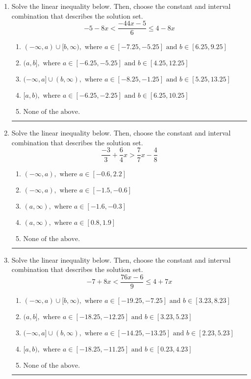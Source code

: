 \documentclass[14pt]{extbook}
\newcommand{\litem}[1]{\item#1\hspace*{-1cm}\rule{\textwidth}{0.4pt}}
\begin{document}
\begin{enumerate}
{\begin{enumerate}[label=\Alph*.]
\end{enumerate} }
\litem{
Solve the linear inequality below. Then, choose the constant and interval combination that describes the solution set.\[ -5 - 8 x < \frac{-44 x - 5}{6} \leq 4 - 8 x \]\begin{enumerate}[label=\Alph*.]
\item \( (-\infty, a) \cup [b, \infty), \text{ where } a \in [-7.25, -5.25] \text{ and } b \in [6.25, 9.25] \)
\item \( (a, b], \text{ where } a \in [-6.25, -5.25] \text{ and } b \in [4.25, 12.25] \)
\item \( (-\infty, a] \cup (b, \infty), \text{ where } a \in [-8.25, -1.25] \text{ and } b \in [5.25, 13.25] \)
\item \( [a, b), \text{ where } a \in [-6.25, -2.25] \text{ and } b \in [6.25, 10.25] \)
\item \( \text{None of the above.} \)

\end{enumerate} }
\litem{
Solve the linear inequality below. Then, choose the constant and interval combination that describes the solution set.\[ \frac{-3}{3} + \frac{6}{4} x > \frac{7}{7} x - \frac{4}{8} \]\begin{enumerate}[label=\Alph*.]
\item \( (-\infty, a), \text{ where } a \in [-0.6, 2.2] \)
\item \( (-\infty, a), \text{ where } a \in [-1.5, -0.6] \)
\item \( (a, \infty), \text{ where } a \in [-1.6, -0.3] \)
\item \( (a, \infty), \text{ where } a \in [0.8, 1.9] \)
\item \( \text{None of the above}. \)

\end{enumerate} }
\litem{
Solve the linear inequality below. Then, choose the constant and interval combination that describes the solution set.\[ -7 + 8 x < \frac{76 x - 6}{9} \leq 4 + 7 x \]\begin{enumerate}[label=\Alph*.]
\item \( (-\infty, a) \cup [b, \infty), \text{ where } a \in [-19.25, -7.25] \text{ and } b \in [3.23, 8.23] \)
\item \( (a, b], \text{ where } a \in [-18.25, -12.25] \text{ and } b \in [3.23, 5.23] \)
\item \( (-\infty, a] \cup (b, \infty), \text{ where } a \in [-14.25, -13.25] \text{ and } b \in [2.23, 5.23] \)
\item \( [a, b), \text{ where } a \in [-18.25, -11.25] \text{ and } b \in [0.23, 4.23] \)
\item \( \text{None of the above.} \)


\end{enumerate}}
\end{enumerate}
\end{document}
